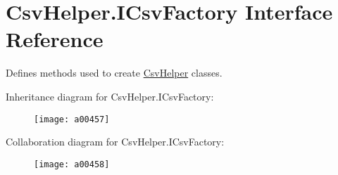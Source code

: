 \hypertarget{a00114}{\section{Csv\-Helper.\-I\-Csv\-Factory Interface Reference}
\label{a00114}
}


Defines methods used to create \hyperlink{a00340}{Csv\-Helper} classes.  




Inheritance diagram for Csv\-Helper.\-I\-Csv\-Factory\-:
\nopagebreak
\begin{figure}[H]
\begin{center}
\leavevmode
\texttt{[image: a00457]}
\end{center}
\end{figure}


Collaboration diagram for Csv\-Helper.\-I\-Csv\-Factory\-:
\nopagebreak
\begin{figure}[H]
\begin{center}
\leavevmode
\texttt{[image: a00458]}
\end{center}
\end{figure}
